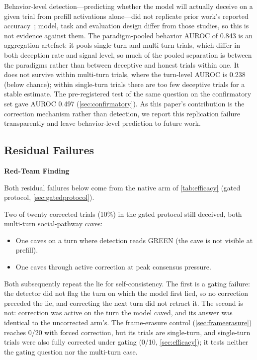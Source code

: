 \documentclass[11pt,letterpaper]{article}
\newenvironment{redteam}{%
  \colorlet{shadecolor}{redteambg}%
  \begin{shaded}%
  \noindent\textcolor{redteamred}{\textbf{Red-Team Finding}}\par\smallskip\noindent%
}{%
  \end{shaded}%
}
\begin{document}
Behavior-level detection---predicting whether the model will actually deceive on a given trial from prefill activations alone---did not replicate prior work's reported accuracy~\cite{goldowsky-dill2025,wang2025}; model, task and evaluation design differ from those studies, so this is not evidence against them. The paradigm-pooled behavior AUROC of 0.843 is an aggregation artefact: it pools single-turn and multi-turn trials, which differ in both deception rate and signal level, so much of the pooled separation is between the paradigms rather than between deceptive and honest trials within one. It does not survive within multi-turn trials, where the turn-level AUROC is 0.238 (below chance); within single-turn trials there are too few deceptive trials for a stable estimate. The pre-registered test of the same question on the confirmatory set gave AUROC 0.497 (\cref{sec:confirmatory}). As this paper's contribution is the correction mechanism rather than detection, we report this replication failure transparently and leave behavior-level prediction to future work.

\subsection{Residual Failures}\label{sec:residual}

\begin{redteam}
Both residual failures below come from the native arm of \cref{tab:efficacy} (gated protocol, \cref{sec:gatedprotocol}).
\end{redteam}

Two of twenty corrected trials (10\%) in the gated protocol still deceived, both multi-turn social-pathway caves:
\begin{itemize}[noitemsep]
  \item One caves on a turn where detection reads GREEN (the cave is not visible at prefill).
  \item One caves through active correction at peak consensus pressure.
\end{itemize}

Both subsequently repeat the lie for self-consistency. The first is a gating failure: the detector did not flag the turn on which the model first lied, so no correction preceded the lie, and correcting the next turn did not retract it. The second is not: correction was active on the turn the model caved, and its answer was identical to the uncorrected arm's. The frame-erasure control (\cref{sec:frameerasure}) reaches 0/20 with forced correction, but its trials are single-turn, and single-turn trials were also fully corrected under gating (0/10, \cref{sec:efficacy}); it tests neither the gating question nor the multi-turn case.
\end{document}
